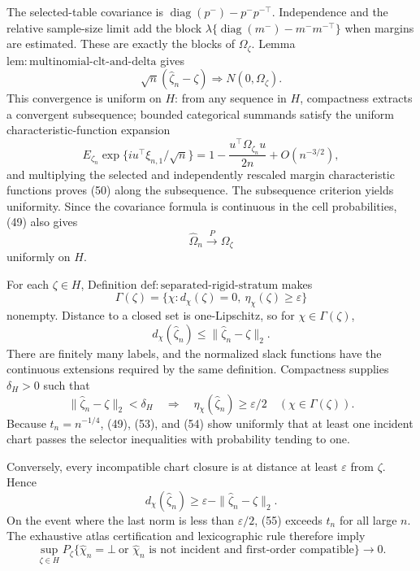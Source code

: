 The selected-table covariance is
\(\operatorname{diag}(p^-)-p^-p^{-\top}\).  Independence and the relative sample-size limit add the block
\(\lambda\{\operatorname{diag}(m^-)-m^-m^{-\top}\}\) when margins are estimated.  These are exactly the blocks of \(\Omega_{\zeta}\).  Lemma \(\mathrm{lem{:}multinomial\text{-}clt\text{-}and\text{-}delta}\) gives
\[
 \sqrt n(\widehat\zeta_n-\zeta)
 \Rightarrow N(0,\Omega_{\zeta}).                         \tag{50}
\]
This convergence is uniform on \(H\): from any sequence in \(H\), compactness extracts a convergent subsequence; bounded categorical summands satisfy the uniform characteristic-function expansion
\[
 E_{\zeta_n}\exp\{iu^{\top}\xi_{n,1}/\sqrt n\}
 =1-\frac{u^{\top}\Omega_{\zeta_n}u}{2n}+O(n^{-3/2}),    \tag{51}
\]
and multiplying the selected and independently rescaled margin characteristic functions proves (50) along the subsequence.  The subsequence criterion yields uniformity.  Since the covariance formula is continuous in the cell probabilities, (49) also gives
\[
 \widehat\Omega_n\xrightarrow{P}\Omega_{\zeta}          \tag{52}
\]
uniformly on \(H\).

For each \(\zeta\in H\), Definition \(\mathrm{def{:}separated\text{-}rigid\text{-}stratum}\) makes
\[
 \Gamma(\zeta)=\{\chi:d_{\chi}(\zeta)=0,
                    \ \eta_{\chi}(\zeta)\ge\varepsilon\}
\]
nonempty.  Distance to a closed set is one-Lipschitz, so for \(\chi\in\Gamma(\zeta)\),
\[
 d_{\chi}(\widehat\zeta_n)
 \le\|\widehat\zeta_n-\zeta\|_2.                       \tag{53}
\]
There are finitely many labels, and the normalized slack functions have the continuous extensions required by the same definition.  Compactness supplies \(\delta_H>0\) such that
\[
 \|\widehat\zeta_n-\zeta\|_2<\delta_H
 \quad\Longrightarrow\quad
 \eta_{\chi}(\widehat\zeta_n)\ge\varepsilon/2
 \quad(\chi\in\Gamma(\zeta)).                           \tag{54}
\]
Because \(t_n=n^{-1/4}\), (49), (53), and (54) show uniformly that at least one incident chart passes the selector inequalities with probability tending to one.

Conversely, every incompatible chart closure is at distance at least \(\varepsilon\) from \(\zeta\).  Hence
\[
 d_{\chi}(\widehat\zeta_n)
 \ge\varepsilon-\|\widehat\zeta_n-\zeta\|_2.           \tag{55}
\]
On the event where the last norm is less than \(\varepsilon/2\), (55) exceeds \(t_n\) for all large \(n\).  The exhaustive atlas certification and lexicographic rule therefore imply
\[
 \sup_{\zeta\in H}P_{\zeta}
 \{\widehat\chi_n=\bot\ \text{or }\widehat\chi_n
   \text{ is not incident and first-order compatible}\}
 \longrightarrow0.                                       \tag{56}
\]

